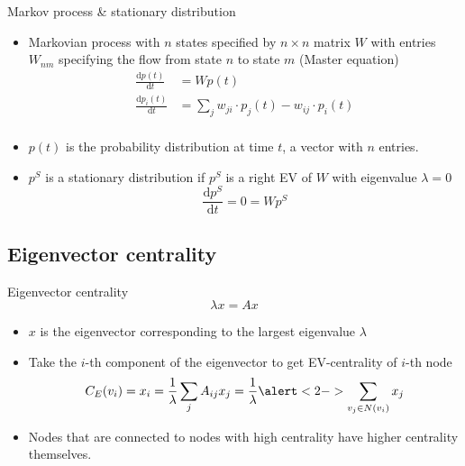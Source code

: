 \documentclass[]{beamer}
\begin{document}
\begin{frame}{Markov process \& stationary distribution}
	\begin{itemize}[<+-| alert@+>]
		\item Markovian process with $n$ states specified by $n\times n$ matrix $W$ with entries $W_{nm}$ specifying the flow from state $n$ to state $m$ (Master equation)
		\begin{align*}
			\frac{\mathrm d{p(t)}}{\mathrm d{t}} &= Wp(t)\\
			\frac{\mathrm d{p_i(t)}}{\mathrm d{t}} &= \sum_j w_{ji} \cdot p_j(t)  - w_{ij} \cdot p_i(t)\\
		\end{align*}
		\item $p(t)$ is the probability distribution at time $t$, a vector with $n$ entries. 
		\item $p^S$ is a stationary distribution if $p^S$ is a right EV of $W$ with eigenvalue $\lambda =0 $
		\begin{equation*}
			\frac{\mathrm d p^S}{\mathrm d t} = 0 = Wp^S
		\end{equation*}
	\end{itemize}	
\end{frame}



\subsection{Eigenvector centrality}

\begin{frame}{Eigenvector centrality}
	\begin{equation*}\lambda x = Ax\label{eq:evEq}\end{equation*}
	\begin{itemize}
		\item $x$ is the eigenvector corresponding to the largest eigenvalue $\lambda$
		\item Take the $i$-th component of the eigenvector to get EV-centrality of $i$-th node
		\begin{equation*}
			C_E(v_i) = 	x_i = \frac1{\lambda}\sum_jA_{ij}x_j = \frac1\lambda\alert<2->{\sum_{v_j\in N(v_i)} x_j}
		\end{equation*}
		\item<2-| alert@+> Nodes that are connected to nodes with high centrality have higher centrality themselves.
	\end{itemize}
\end{frame}
\end{document}
